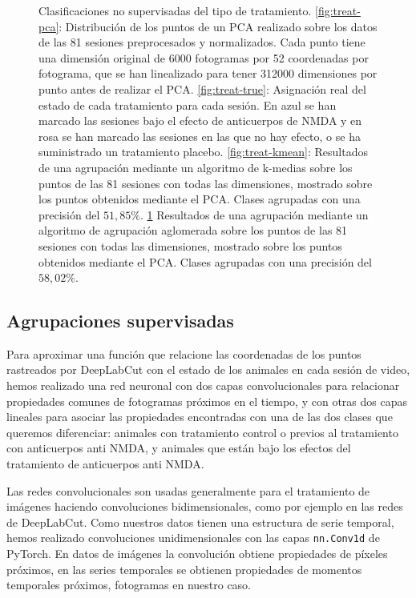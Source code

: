 \begin{figure}[p]
\begin{subfigure}{0.45\textwidth}
    \caption{}
    \label{fig:treat-agg}
  \end{subfigure}
  \caption[Clasificación no supervisada de tratamiento.]{Clasificaciones no supervisadas del tipo de tratamiento. \ref{fig:treat-pca}: Distribución de los puntos de un PCA realizado sobre los datos de las 81 sesiones preprocesados y normalizados. Cada punto tiene una dimensión original de 6000 fotogramas por 52 coordenadas por fotograma, que se han linealizado para tener 312000 dimensiones por punto antes de realizar el PCA. \ref{fig:treat-true}: Asignación real del estado de cada tratamiento para cada sesión. En azul se han marcado las sesiones bajo el efecto de anticuerpos de NMDA y en rosa se han marcado las sesiones en las que no hay efecto, o se ha suministrado un tratamiento placebo. \ref{fig:treat-kmean}: Resultados de una agrupación mediante un algoritmo de k-medias sobre los puntos de las 81 sesiones con todas las dimensiones, mostrado sobre los puntos obtenidos mediante el PCA. Clases agrupadas con una precisión del $ 51,85\% $. \ref{fig:treat-agg} Resultados de una agrupación mediante un algoritmo de agrupación aglomerada sobre los puntos de las 81 sesiones con todas las dimensiones, mostrado sobre los puntos obtenidos mediante el PCA. Clases agrupadas con una precisión del $ 58,02\% $.}
  \label{fig:unsupervied-treatment}
\end{figure}

\subsection{Agrupaciones supervisadas}

Para aproximar una función que relacione las coordenadas de los puntos rastreados por DeepLabCut con el estado de los animales en cada sesión de video, hemos realizado una red neuronal con dos capas convolucionales para relacionar propiedades comunes de fotogramas próximos en el tiempo, y con otras dos capas lineales para asociar las propiedades encontradas con una de las dos clases que queremos diferenciar: animales con tratamiento control o previos al tratamiento con anticuerpos anti NMDA, y animales que están bajo los efectos del tratamiento de anticuerpos anti NMDA.

Las redes convolucionales son usadas generalmente para el tratamiento de imágenes haciendo convoluciones bidimensionales, como por ejemplo en las redes de DeepLabCut. Como nuestros datos tienen una estructura de serie temporal, hemos realizado convoluciones unidimensionales con las capas \texttt{nn.Conv1d} de PyTorch. En datos de imágenes la convolución obtiene propiedades de píxeles próximos, en las series temporales se obtienen propiedades de momentos temporales próximos, fotogramas en nuestro caso.

